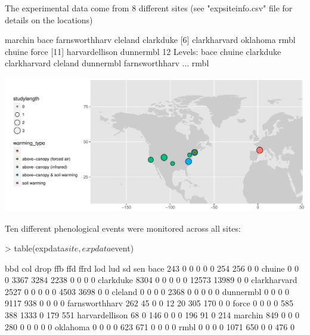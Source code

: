 \documentclass{article}
\begin{document}
The experimental data come from 8 different sites (see "expsiteinfo.csv" file for details on the locations)

\begin{Schunk}
\begin{Soutput}
 [1] marchin        bace           farnsworthharv cleland        clarkduke     
 [6] clarkharvard   oklahoma       rmbl           chuine         force         
[11] harvardellison dunnermbl     
12 Levels: bace chuine clarkduke clarkharvard cleland dunnermbl farnsworthharv ... rmbl
\end{Soutput}
\end{Schunk}
\includegraphics{maps/expsites.pdf}

Ten different phenological events were monitored across all sites:
\begin{Schunk}
\begin{Sinput}
> table(expdata$site, expdata$event)
\end{Sinput}
\begin{Soutput}
                   bbd   col  drop   ffb   ffd  ffrd   lod   lud    sd   sen
  bace             243     0     0     0     0     0   254   256     0     0
  chuine             0     0     0  3367  3284  2238     0     0     0     0
  clarkduke       8304     0     0     0     0     0 12573 13989     0     0
  clarkharvard    2527     0     0     0     0     0  4503  3698     0     0
  cleland            0     0     0     0  2368     0     0     0     0     0
  dunnermbl          0     0     0     0  9117   938     0     0     0     0
  farnsworthharv   262    45     0     0    12    20   305   170     0     0
  force              0     0     0     0   585   388  1333     0   179   551
  harvardellison    68     0   146     0     0     0   196    91     0   214
  marchin          849     0     0     0   280     0     0     0     0     0
  oklahoma           0     0     0     0   623   671     0     0     0     0
  rmbl               0     0     0     0  1071   650     0     0   476     0
\end{Soutput}
\end{Schunk}
\end{document}
